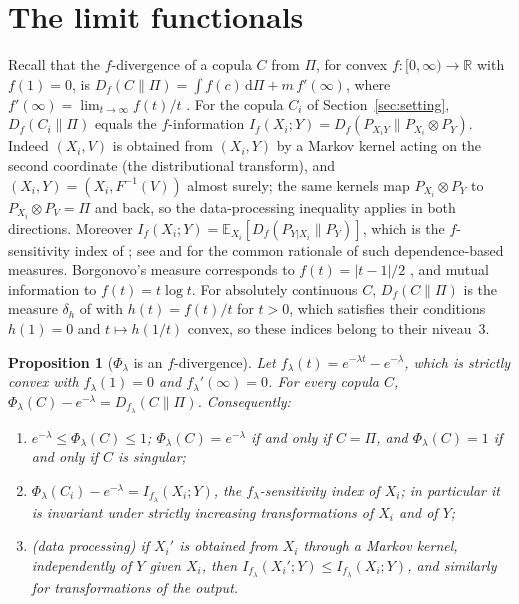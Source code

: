 \documentclass[11pt,a4paper]{article}
\newtheorem{proposition}[theorem]{Proposition}
\theoremstyle{definition}
\theoremstyle{remark}
\newcommand{\E}{\mathbb{E}}
\begin{document}
\section{The limit functionals}\label{sec:functionals}

Recall that the $f$-divergence of a copula $C$ from $\Pi$, for convex $f:[0,\infty)\to\mathbb R$ with $f(1)=0$, is $D_f(C\|\Pi)=\int f(c)\,\mathrm{d}\Pi+m\,f'(\infty)$, where $f'(\infty)=\lim_{t\to\infty}f(t)/t$ \citep{csiszar1967,liese2006}. For the copula $C_i$ of Section~\ref{sec:setting}, $D_f(C_i\|\Pi)$ equals the $f$-information $I_f(X_i;Y)=D_f(P_{X_iY}\|P_{X_i}\otimes P_Y)$. Indeed $(X_i,V)$ is obtained from $(X_i,Y)$ by a Markov kernel acting on the second coordinate (the distributional transform), and $(X_i,Y)=(X_i,F^{-1}(V))$ almost surely; the same kernels map $P_{X_i}\otimes P_Y$ to $P_{X_i}\otimes P_V=\Pi$ and back, so the data-processing inequality \citep{liese2006} applies in both directions. Moreover $I_f(X_i;Y)=\E_{X_i}[D_f(P_{Y|X_i}\|P_Y)]$, which is the $f$-sensitivity index of \citet{rahman2016}; see \citet{borgonovo2016} and \citet{daveiga2015} for the common rationale of such dependence-based measures. Borgonovo's measure corresponds to $f(t)=|t-1|/2$ \citep{borgonovo2007,borgonovo2011}, and mutual information to $f(t)=t\log t$. For absolutely continuous $C$, $D_f(C\|\Pi)$ is the measure $\delta_h$ of \citet[Equation~31]{plischke2019} with $h(t)=f(t)/t$ for $t>0$, which satisfies their conditions $h(1)=0$ and $t\mapsto h(1/t)$ convex, so these indices belong to their niveau~3.

\begin{proposition}[$\Phi_\lambda$ is an $f$-divergence]\label{prop:phi}
Let $f_\lambda(t)=e^{-\lambda t}-e^{-\lambda}$, which is strictly convex with $f_\lambda(1)=0$ and $f_\lambda'(\infty)=0$. For every copula $C$, $\Phi_\lambda(C)-e^{-\lambda}=D_{f_\lambda}(C\|\Pi)$. Consequently:
\begin{enumerate}[label=(\roman*)]
\item $e^{-\lambda}\le\Phi_\lambda(C)\le1$; $\Phi_\lambda(C)=e^{-\lambda}$ if and only if $C=\Pi$, and $\Phi_\lambda(C)=1$ if and only if $C$ is singular;
\item $\Phi_\lambda(C_i)-e^{-\lambda}=I_{f_\lambda}(X_i;Y)$, the $f_\lambda$-sensitivity index of $X_i$; in particular it is invariant under strictly increasing transformations of $X_i$ and of $Y$;
\item (data processing) if $X_i'$ is obtained from $X_i$ through a Markov kernel, independently of $Y$ given $X_i$, then $I_{f_\lambda}(X_i';Y)\le I_{f_\lambda}(X_i;Y)$, and similarly for transformations of the output.
\end{enumerate}
\end{proposition}
\end{document}
